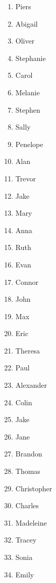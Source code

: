 \begin{figure}[H]
\begin{multicols}{4}
\begin{enumerate}
    \item Piers
    \item Abigail
    \item Oliver
    \item Stephanie
    \item Carol
    \item Melanie
    \item Stephen
    \item Sally
    \item Penelope
    \item Alan
    \item Trevor
    \item Jake
    \item Mary
    \item Anna
    \item Ruth
    \item Evan
    \item Connor
    \item John
    \item Max
    \item Eric
    \item Theresa
    \item Paul
    \item Alexander
    \item Colin
    \item Jake
    \item Jane
    \item Brandon
    \item Thomas
    \item Christopher
    \item Charles
    \item Madeleine
    \item Tracey
    \item Sonia
    \item Emily
\end{enumerate}
\end{multicols}
\end{figure}
